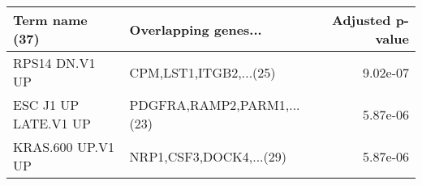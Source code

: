 \begin{tabular}{llr}
\toprule
      Term name (37) &       Overlapping genes... &  Adjusted p-value \\
\midrule
      RPS14 DN.V1 UP &     CPM,LST1,ITGB2,...(25) &          9.02e-07 \\
ESC J1 UP LATE.V1 UP & PDGFRA,RAMP2,PARM1,...(23) &          5.87e-06 \\
   KRAS.600 UP.V1 UP &    NRP1,CSF3,DOCK4,...(29) &          5.87e-06 \\
\bottomrule
\end{tabular}
